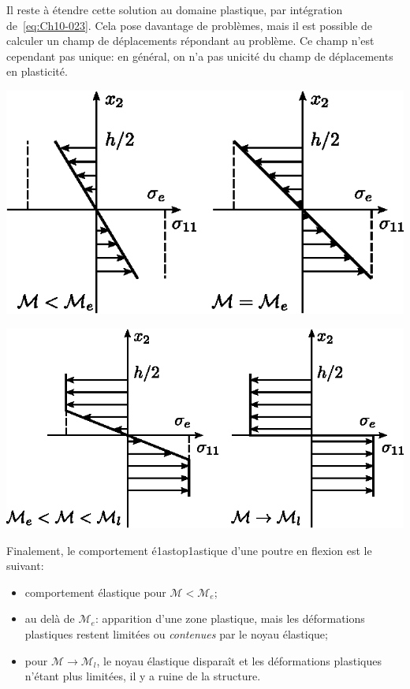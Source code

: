 Il reste à étendre cette solution au domaine plastique, par intégration de~\eqref{eq:Ch10-023}.
Cela pose davantage de problèmes, mais il est possible de calculer un champ de déplacements répondant au problème.
Ce champ n'est cependant pas unique: en général, on n'a pas unicité du champ de déplacements en plasticité. 

\begin{center}
    \includegraphics{../images/T1_Ch10-14a}

    \includegraphics{../images/T1_Ch10-14b}
\end{center}

Finalement, le comportement é1astop1astique d'une poutre en flexion est le suivant: 
\begin{itemize}
    \item comportement élastique pour $\mathcal{M}<\mathcal{M}_e$;
    \item au delà de $\mathcal{M}_e$: apparition d'une zone plastique, mais les déformations plastiques restent limitées ou \emph{contenues} par le noyau élastique; 
    \item pour $\mathcal{M} \rightarrow \mathcal{M}_l$, le noyau élastique disparaît et les déformations plastiques n'étant plus limitées, il y a ruine de la structure. 
\end{itemize}

